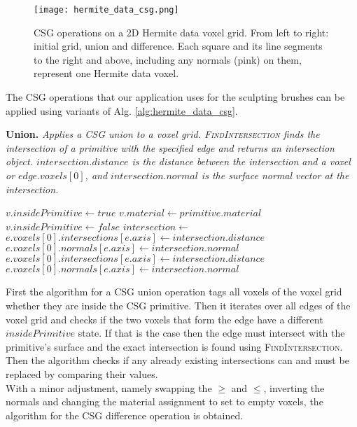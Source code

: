 \begin{figure}
\centering
\captionsetup{width=0.8\textwidth}
\texttt{[image: hermite\_data\_csg.png]}
\caption{CSG operations on a 2D Hermite data voxel grid. From left to right: initial grid, union and difference. Each square and its line segments to the right and above,
including any normals (pink) on them, represent one Hermite data voxel.}
\label{fig:hermite_data_csg}
\end{figure}

The CSG operations that our application uses for the sculpting brushes can be applied using variants of Alg. \ref{alg:hermite_data_csg}. 

\begin{algorithm}[H]
\caption{\textbf{Union.} \textit{Applies a CSG union to a voxel grid. \textsc{FindIntersection} finds the intersection of a primitive with the specified edge
and returns an intersection object. $intersection.distance$ is the distance between the intersection and a voxel or $edge.voxels[0]$, and $intersection.normal$ is the 
surface normal vector at the intersection.}}\label{alg:hermite_data_csg}
\begin{algorithmic}[1]
				\State $v.insidePrimitive \gets true$
				\State $v.material \gets primitive.material$
			\Else
				\State $v.insidePrimitive \gets false$
			\EndIf
	\EndFor
			\State $intersection \gets$ 
				\State $e.voxels[0].intersections[e.axis] \gets intersection.distance$
				\State $e.voxels[0].normals[e.axis] \gets intersection.normal$
				\State $e.voxels[0].intersections[e.axis] \gets intersection.distance$
				\State $e.voxels[0].normals[e.axis] \gets intersection.normal$
			\EndIf
		\EndIf
	\EndFor
\EndProcedure
\end{algorithmic}
\end{algorithm}

First the algorithm for a CSG union operation tags all voxels of the voxel grid whether they are inside the CSG primitive. Then it iterates over all edges of the voxel grid and checks if the two voxels
that form the edge have a different $insidePrimitive$ state. If that is the case then the edge must intersect with the primitive's surface and the exact intersection is found
using \textsc{FindIntersection}. Then the algorithm checks if any already existing intersections can and must be replaced by comparing their values.\\
With a minor adjustment, namely swapping the $\geq$ and $\leq$, inverting the normals and changing the material assignment to set to empty voxels, the algorithm for the CSG difference operation is obtained. \par

